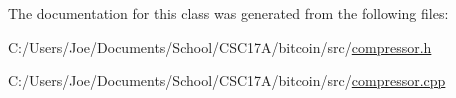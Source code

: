 The documentation for this class was generated from the following files\+:\begin{DoxyCompactItemize}
\item 
C\+:/\+Users/\+Joe/\+Documents/\+School/\+C\+S\+C17\+A/bitcoin/src/\hyperlink{compressor_8h}{compressor.\+h}\item 
C\+:/\+Users/\+Joe/\+Documents/\+School/\+C\+S\+C17\+A/bitcoin/src/\hyperlink{compressor_8cpp}{compressor.\+cpp}\end{DoxyCompactItemize}

